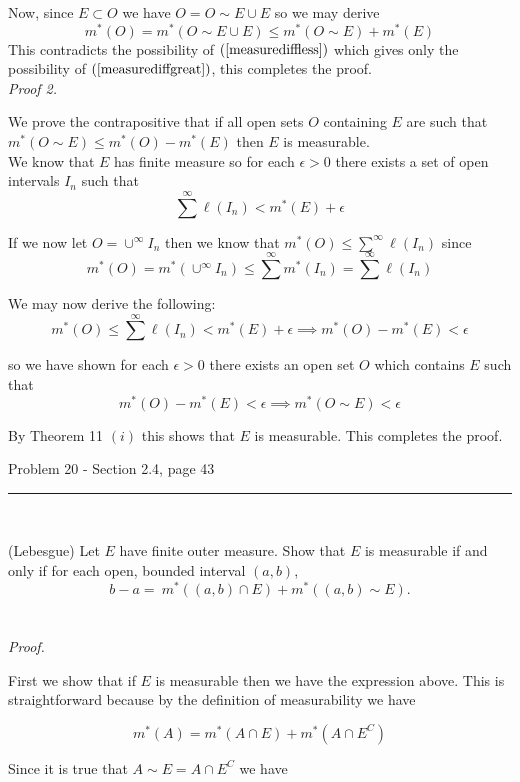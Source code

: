 \documentclass[11pt,reqno]{article}
\begin{document}
Now, since $E \subset O$ we have $O = O \sim E \cup E$ so we may derive 
\[ m^*(O) =  m^*(O \sim E \cup E) \le m^*(O \sim E) + m^*(E)  \]
This contradicts the possibility of $(\ref{measurediffless})$ which gives only the possibility of $(\ref{measurediffgreat})$, this completes the proof.\\

\emph{Proof 2.}

We prove the contrapositive that if all open sets $O$ containing $E$ are such that\\ $m^*(O \sim E) \le m^*(O) - m^*(E)$ then $E$ is measurable.\\
We know that $E$ has finite measure so for each $\epsilon > 0$ there exists a set of open intervals $I_n$ such that 
\[ \sum^\infty \ell(I_n) < m^*(E) + \epsilon\]

\noindent If we now let $O = \cup^\infty I_n$ then we know that $m^*(O) \le \sum^\infty \ell(I_n)$ since 
\[ m^*(O) = m^*(  \cup^\infty I_n ) \le \sum^\infty m^*(I_n) = \sum^\infty \ell(I_n)  \]

\noindent We may now derive the following:
\[ m^*(O) \le \sum^\infty \ell(I_n) < m^*(E) + \epsilon \implies m^*(O) - m^*(E) < \epsilon \]

\noindent so we have shown for each $\epsilon > 0$ there exists an open set $O$ which contains $E$ such that 
\[ m^*(O) - m^*(E) < \epsilon \implies m^*(O \sim E) < \epsilon\]

\noindent By Theorem 11 $(i)$ this shows that $E$ is measurable. This completes the proof.

\begin{flushleft} 
Problem 20 - Section 2.4, page 43\\
\rule{500pt}{1pt}\\
\end{flushleft} 

(Lebesgue) Let $E$ have finite outer measure. Show that $E$ is measurable if and only if for each open, bounded interval $(a,b)$,
\[ b - a =  \ m^*((a,b) \cap E) + m^*((a,b) \sim E). \]
\\\\ \emph{Proof.}

First we show that if $E$ is measurable then we have the expression above. This is straightforward because  by the definition of measurability we have

\[  m^*(A) = m^*(A \cap E) + m^*(A \cap E^C) \]

\noindent Since it is true that $A \sim E = A \cap E^C$ we have
\end{document}
